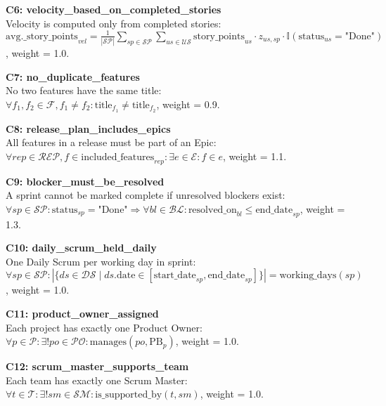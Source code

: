 \documentclass[12pt]{article}
\begin{document}
    \item \textbf{C6: velocity_based_on_completed_stories} \\
    Velocity is computed only from completed stories: \\
    $\text{avg.\_story\_points}_{vel} = \frac{1}{|\mathcal{SP}|} \sum_{sp \in \mathcal{SP}} \sum_{us \in \mathcal{US}} \text{story\_points}_{us} \cdot z_{us,sp} \cdot \mathbb{I}(\text{status}_{us} = \text{"Done"})$, weight = 1.0.

    \item \textbf{C7: no_duplicate_features} \\
    No two features have the same title: \\
    $\forall f_1, f_2 \in \mathcal{F}, f_1 \neq f_2: \text{title}_{f_1} \neq \text{title}_{f_2}$, weight = 0.9.

    \item \textbf{C8: release_plan_includes_epics} \\
    All features in a release must be part of an Epic: \\
    $\forall rep \in \mathcal{REP}, f \in \text{included\_features}_{rep}: \exists e \in \mathcal{E}: f \in e$, weight = 1.1.

    \item \textbf{C9: blocker_must_be_resolved} \\
    A sprint cannot be marked complete if unresolved blockers exist: \\
    $\forall sp \in \mathcal{SP}: \text{status}_{sp} = \text{"Done"} \Rightarrow \forall bl \in \mathcal{BL}: \text{resolved\_on}_{bl} \leq \text{end\_date}_{sp}$, weight = 1.3.

    \item \textbf{C10: daily_scrum_held_daily} \\
    One Daily Scrum per working day in sprint: \\
    $\forall sp \in \mathcal{SP}: |\{ ds \in \mathcal{DS} \mid ds.\text{date} \in [\text{start\_date}_{sp}, \text{end\_date}_{sp}] \}| = \text{working\_days}(sp)$, weight = 1.0.

    \item \textbf{C11: product_owner_assigned} \\
    Each project has exactly one Product Owner: \\
    $\forall p \in \mathcal{P}: \exists! po \in \mathcal{PO}: \text{manages}(po, \text{PB}_p)$, weight = 1.0.

    \item \textbf{C12: scrum_master_supports_team} \\
    Each team has exactly one Scrum Master: \\
    $\forall t \in \mathcal{T}: \exists! sm \in \mathcal{SM}: \text{is\_supported\_by}(t, sm)$, weight = 1.0.
\end{document}
